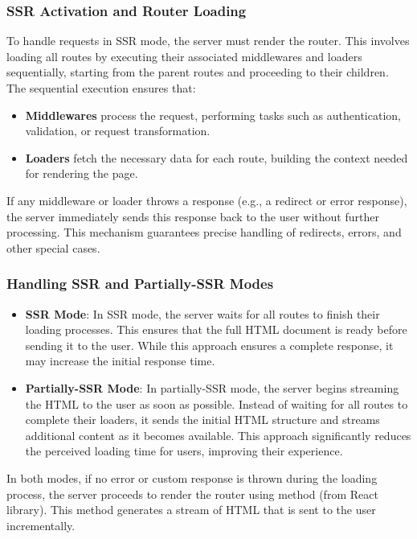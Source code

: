 \subsubsection{SSR Activation and Router Loading}
To handle requests in SSR mode, the server must render the router. This involves loading all routes by executing their associated middlewares and loaders sequentially, starting from the parent routes and proceeding to their children. The sequential execution ensures that:
\begin{itemize}
  \item \textbf{Middlewares} process the request, performing tasks such as authentication, validation, or request transformation.
  \item \textbf{Loaders} fetch the necessary data for each route, building the context needed for rendering the page.
\end{itemize}
If any middleware or loader throws a response (e.g., a redirect or error response), the server immediately sends this response back to the user without further processing. This mechanism guarantees precise handling of redirects, errors, and other special cases.

\subsubsection{Handling SSR and Partially-SSR Modes}
\begin{itemize}
  \item \textbf{SSR Mode}: In SSR mode, the server waits for all routes to finish their loading processes. This ensures that the full HTML document is ready before sending it to the user. While this approach ensures a complete response, it may increase the initial response time.
  \item \textbf{Partially-SSR Mode}: In partially-SSR mode, the server begins streaming the HTML to the user as soon as possible. Instead of waiting for all routes to complete their loaders, it sends the initial HTML structure and streams additional content as it becomes available. This approach significantly reduces the perceived loading time for users, improving their experience.
\end{itemize}
In both modes, if no error or custom response is thrown during the loading process, the server proceeds to render the router using  method (from React library). This method generates a stream of HTML that is sent to the user incrementally.

